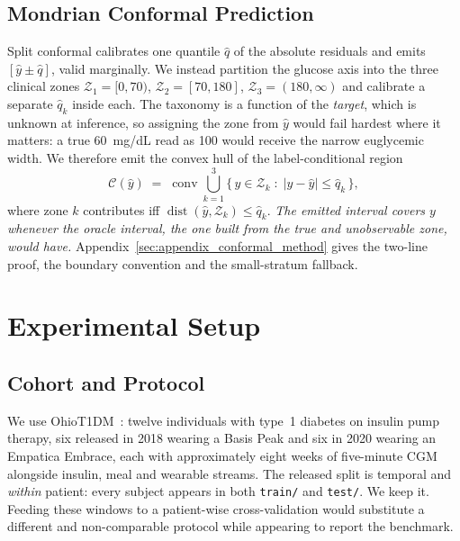 \documentclass[pmlr,twocolumn,10pt]{jmlr}
\newcommand{\zone}[1]{\mathcal{Z}_{#1}}
\begin{document}
\subsection{Mondrian Conformal Prediction}
\label{sec:conformal}

Split conformal calibrates one quantile $\hat{q}$ of the absolute residuals and
emits $[\hat{y} \pm \hat{q}]$, valid marginally. We instead partition the glucose
axis into the three clinical zones $\zone{1} = [0, 70)$, $\zone{2} = [70, 180]$,
$\zone{3} = (180, \infty)$ and calibrate a separate $\hat{q}_k$ inside each. The
taxonomy is a function of the \emph{target}, which is unknown at inference, so
assigning the zone from $\hat{y}$ would fail hardest where it matters: a true
60~mg/dL read as 100 would receive the narrow euglycemic width. We therefore emit
the convex hull of the label-conditional region
\begin{equation}
  \mathcal{C}(\hat{y}) \;=\;
  \operatorname{conv} \bigcup_{k=1}^{3}
    \big\{\, y \in \zone{k} \;:\; |y - \hat{y}| \le \hat{q}_k \,\big\},
  \label{eq:mondrian}
\end{equation}
where zone $k$ contributes iff
$\operatorname{dist}(\hat{y}, \zone{k}) \le \hat{q}_k$. \emph{The emitted interval
covers $y$ whenever the oracle interval, the one built from the true and
unobservable zone, would have.} Appendix~\ref{sec:appendix_conformal_method}
gives the two-line proof, the boundary convention and the small-stratum
fallback.

\section{Experimental Setup}
\label{sec:setup}

\subsection{Cohort and Protocol}

We use OhioT1DM~\citep{marling2018ohiot1dm,marling2020ohiot1dm}: twelve
individuals with type~1 diabetes on insulin pump therapy, six released in 2018
wearing a Basis Peak and six in 2020 wearing an Empatica Embrace, each with
approximately eight weeks of five-minute CGM alongside insulin, meal and
wearable streams. The released split is temporal and \emph{within} patient:
every subject appears in both \texttt{train/} and \texttt{test/}. We keep it.
Feeding these windows to a patient-wise cross-validation would substitute a
different and non-comparable protocol while appearing to report the benchmark.
\end{document}
